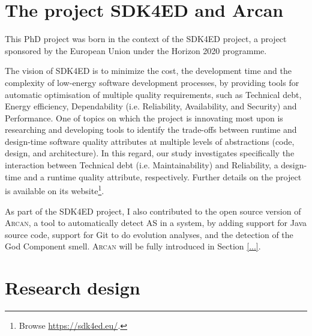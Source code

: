 
\section{The project SDK4ED and Arcan}
This PhD project was born in the context of the SDK4ED project, a project sponsored by the European Union under the Horizon 2020 programme.

The vision of SDK4ED is to minimize the cost, the development time and the complexity of low-energy software development processes, by providing tools for automatic optimisation of multiple quality requirements, such as Technical debt, Energy efficiency, Dependability (i.e. Reliability, Availability, and Security) and Performance. 
One of topics on which the project is innovating most upon is researching and developing tools to identify the trade-offs between runtime and design-time software quality attributes at multiple levels of abstractions (code, design, and architecture).
In this regard, our study investigates specifically the interaction between Technical debt (i.e. Maintainability) and Reliability, a design-time and a runtime quality attribute, respectively. Further details on the project is available on its website\footnote{Browse \url{https://sdk4ed.eu/}.}.

As part of the SDK4ED project, I also contributed to the open source version of \textsc{Arcan}, a tool to automatically detect AS in a system, by adding support for Java source code, support for Git to do evolution analyses, and the detection of the God Component smell.
\textsc{Arcan} will be fully introduced in Section \ref{...}.

\section{Research design}\label{sec:intro:research-design}
